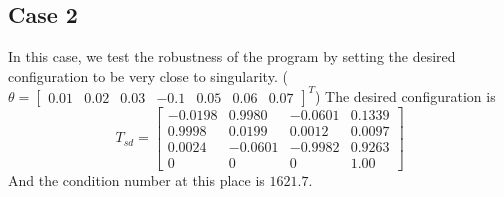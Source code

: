 \documentclass[english,10pt,a4paper]{article}
\begin{document}
    \subsection*{Case 2}
    In this case, we test the robustness of the program by setting the desired configuration to be very close to singularity. (\(\theta = \begin{bmatrix}
        0.01 & 0.02 & 0.03 & -0.1 & 0.05 & 0.06 & 0.07 \end{bmatrix}^T\)) The desired configuration is
    \begin{equation}
        T_{sd} = \begin{bmatrix}
            -0.0198 & 0.9980 & -0.0601 & 0.1339\\
            0.9998 & 0.0199 & 0.0012 & 0.0097\\
            0.0024 & -0.0601 & -0.9982 & 0.9263\\
            0 & 0 & 0 & 1.00
        \end{bmatrix}
    \end{equation}
    And the condition number at this place is \(1621.7\).
    
\end{document}
